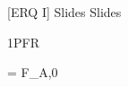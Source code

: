 \documentclass[\mainfilename]{subfiles}
\begin{document}

[ERQ I]
{Slides} %
{Slides} %


\begin{sectionBox}1{PFR} %
    
    \begin{BM}
         = F_{A,0}\,
    \end{BM}
    
\end{sectionBox}
\end{document}
